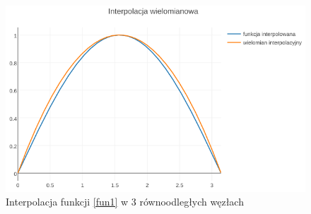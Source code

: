 \documentclass{article}
\begin{document}
\begin{figure}[ht]
	\begin{center}
		\includegraphics[width=13cm]{lagrange_sin}
	\end{center}
	\caption{Interpolacja funkcji \eqref{fun1} w 3 równoodległych węzłach}
	\label{fig:1}
\end{figure}
\end{document}
